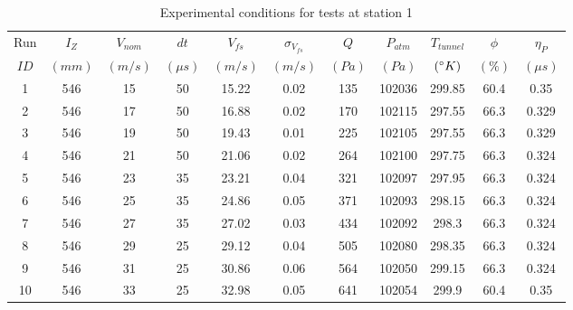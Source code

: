 \begin{table}[H]
\begin{center}
\begin{tabular}{|ccccccccccc|}
	\hline
	Run & $I_Z$ & $V_{nom}$ & $dt$ & $V_{fs}$ & $\sigma_{V_{fs}}$ & $Q$ & $P_{atm}$ & $T_{tunnel}$ & $\phi$ & $\eta_P$\\
	$ID$ & $(mm)$ & $(m/s)$ & $(\mu s)$ & $(m/s)$ & $(m/s)$ & $(Pa)$ & $(Pa)$ & $(\degree K)$ & $(\%)$ & $(\mu s)$\\
	\hline
	1 & 546 & 15 & 50 & 15.22 & 0.02 & 135 & 102036 & 299.85 & 60.4 & 0.35\\
	2 & 546 & 17 & 50 & 16.88 & 0.02 & 170 & 102115 & 297.55 & 66.3 & 0.329\\
	3 & 546 & 19 & 50 & 19.43 & 0.01 & 225 & 102105 & 297.55 & 66.3 & 0.329\\
	4 & 546 & 21 & 50 & 21.06 & 0.02 & 264 & 102100 & 297.75 & 66.3 & 0.324\\
	5 & 546 & 23 & 35 & 23.21 & 0.04 & 321 & 102097 & 297.95 & 66.3 & 0.324\\
	6 & 546 & 25 & 35 & 24.86 & 0.05 & 371 & 102093 & 298.15 & 66.3 & 0.324\\
	7 & 546 & 27 & 35 & 27.02 & 0.03 & 434 & 102092 & 298.3 & 66.3 & 0.324\\
	8 & 546 & 29 & 25 & 29.12 & 0.04 & 505 & 102080 & 298.35 & 66.3 & 0.324\\
	9 & 546 & 31 & 25 & 30.86 & 0.06 & 564 & 102050 & 299.15 & 66.3 & 0.324\\
	10 & 546 & 33 & 25 & 32.98 & 0.05 & 641 & 102054 & 299.9 & 60.4 & 0.35\\
	\hline
\end{tabular}
\caption{Experimental conditions for tests at station 1}
\label{table:station_1_measurements.}
\end{center}
\end{table}
